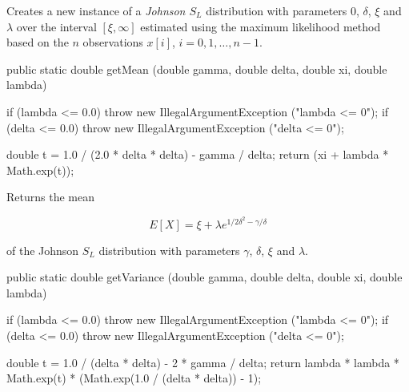 \begin{tabb}
   Creates a new instance of a \emph{Johnson $S_L$} distribution with
   parameters 0, $\delta$, $\xi$ and
   $\lambda$ over the interval $[\xi,\infty]$ estimated using the maximum likelihood
    method based on the $n$ observations $x[i]$, $i = 0, 1, \ldots, n-1$.
\end{tabb}
\begin{htmlonly}
\end{htmlonly}
\begin{code}

   public static double getMean (double gamma, double delta,
                                 double xi, double lambda)\begin{hide} {
      if (lambda <= 0.0)
         throw new IllegalArgumentException ("lambda <= 0");
      if (delta <= 0.0)
         throw new IllegalArgumentException ("delta <= 0");

      double t = 1.0 / (2.0 * delta * delta) - gamma / delta;
      return (xi + lambda * Math.exp(t));
   }\end{hide}
\end{code}
\begin{tabb}  Returns the mean
\begin{latexonly}
   \[E[X] = \xi + \lambda e^{1/2\delta^2 - \gamma/\delta}\]
\end{latexonly}%
   of the Johnson $S_L$ distribution with parameters $\gamma$, $\delta$, $\xi$
   and $\lambda$.
\end{tabb}
\begin{htmlonly}
\end{htmlonly}
\begin{code}

   public static double getVariance (double gamma, double delta,
                                     double xi, double lambda)\begin{hide} {
      if (lambda <= 0.0)
         throw new IllegalArgumentException ("lambda <= 0");
      if (delta <= 0.0)
         throw new IllegalArgumentException ("delta <= 0");

      double t = 1.0 / (delta * delta) - 2 * gamma / delta;
      return lambda * lambda * Math.exp(t) * (Math.exp(1.0 / (delta * delta)) - 1);
   }\end{hide}
\end{code}
